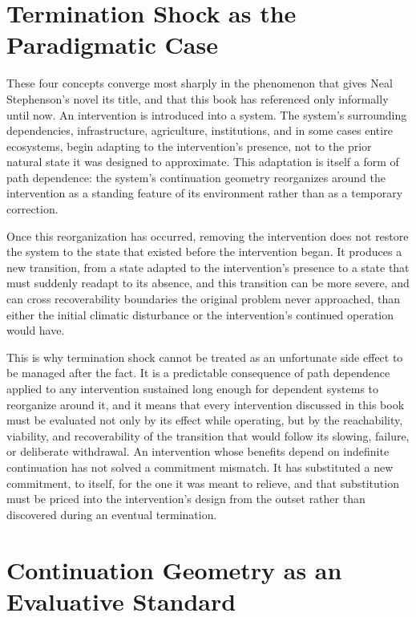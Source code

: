 \documentclass[11pt,oneside]{book}
\begin{document}
\section*{Termination Shock as the Paradigmatic Case}

These four concepts converge most sharply in the phenomenon that gives Neal Stephenson's novel its title, and that this book has referenced only informally until now. An intervention is introduced into a system. The system's surrounding dependencies, infrastructure, agriculture, institutions, and in some cases entire ecosystems, begin adapting to the intervention's presence, not to the prior natural state it was designed to approximate. This adaptation is itself a form of path dependence: the system's continuation geometry reorganizes around the intervention as a standing feature of its environment rather than as a temporary correction.

Once this reorganization has occurred, removing the intervention does not restore the system to the state that existed before the intervention began. It produces a new transition, from a state adapted to the intervention's presence to a state that must suddenly readapt to its absence, and this transition can be more severe, and can cross recoverability boundaries the original problem never approached, than either the initial climatic disturbance or the intervention's continued operation would have.

This is why termination shock cannot be treated as an unfortunate side effect to be managed after the fact. It is a predictable consequence of path dependence applied to any intervention sustained long enough for dependent systems to reorganize around it, and it means that every intervention discussed in this book must be evaluated not only by its effect while operating, but by the reachability, viability, and recoverability of the transition that would follow its slowing, failure, or deliberate withdrawal. An intervention whose benefits depend on indefinite continuation has not solved a commitment mismatch. It has substituted a new commitment, to itself, for the one it was meant to relieve, and that substitution must be priced into the intervention's design from the outset rather than discovered during an eventual termination.

\section*{Continuation Geometry as an Evaluative Standard}
\end{document}
